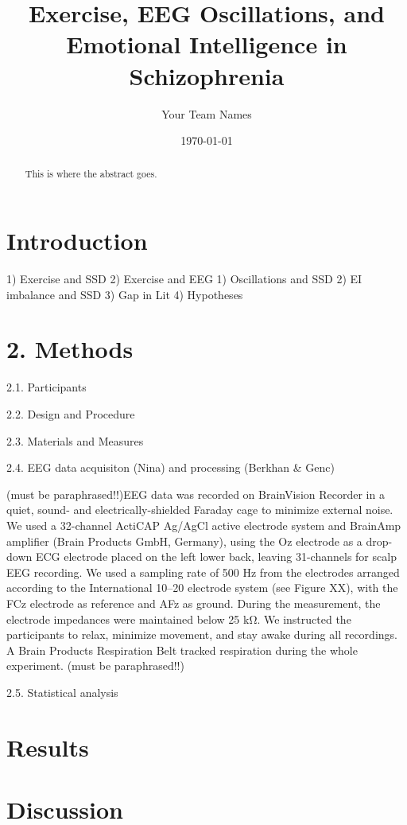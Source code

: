 \documentclass[12pt]{article}
\title{Exercise, EEG Oscillations, and Emotional Intelligence in Schizophrenia}
\author{Your Team Names}
\date{\today}
\begin{document}
\maketitle

\begin{abstract}
This is where the abstract goes.
\end{abstract}

\section{Introduction}

1) Exercise and SSD
2) Exercise and EEG
1) Oscillations and SSD
2) EI imbalance and SSD
3) Gap in Lit
4) Hypotheses


\section{2. Methods}

2.1. Participants 

2.2. Design and Procedure

2.3. Materials and Measures

2.4. EEG data acquisiton (Nina) and processing (Berkhan & Genc) 

(must be paraphrased!!)EEG data was recorded on BrainVision Recorder in a quiet, sound- and electrically-shielded Faraday cage to minimize external noise. We used a 32-channel ActiCAP Ag/AgCl active electrode system and BrainAmp amplifier (Brain Products GmbH, Germany), using the Oz electrode as a drop-down ECG electrode placed on the left lower back, leaving 31-channels for scalp EEG recording. We used a sampling rate of 500 Hz from the electrodes arranged according to the International 10–20 electrode system (see Figure XX), with the FCz electrode as reference and AFz as ground. During the measurement, the electrode impedances were maintained below 25 kΩ. We instructed the participants to relax, minimize movement, and stay awake during all recordings. A Brain Products Respiration Belt tracked respiration during the whole experiment. (must be paraphrased!!)

2.5. Statistical analysis


\section{Results}

\section{Discussion}


\end{document}
